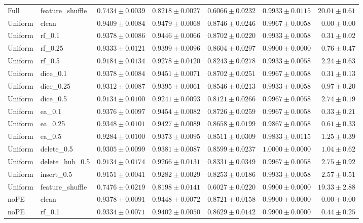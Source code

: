 \documentclass[UTF8,a4paper,11pt,fontset=fandol]{ctexart}
\begin{document}
{\begin{longtable}{llrrrrr}
Full & feature\_shuffle & $0.7434\pm0.0039$ & $0.8218\pm0.0027$ & $0.6066\pm0.0232$ & $0.9933\pm0.0115$ & $20.01\pm0.61$ \\
Uniform & clean & $0.9409\pm0.0084$ & $0.9479\pm0.0068$ & $0.8746\pm0.0246$ & $0.9967\pm0.0058$ & $0.00\pm0.00$ \\
Uniform & rf\_0.1 & $0.9378\pm0.0086$ & $0.9446\pm0.0066$ & $0.8702\pm0.0220$ & $0.9933\pm0.0058$ & $0.31\pm0.02$ \\
Uniform & rf\_0.25 & $0.9333\pm0.0121$ & $0.9399\pm0.0096$ & $0.8604\pm0.0297$ & $0.9900\pm0.0000$ & $0.76\pm0.47$ \\
Uniform & rf\_0.5 & $0.9184\pm0.0134$ & $0.9278\pm0.0120$ & $0.8243\pm0.0278$ & $0.9933\pm0.0058$ & $2.24\pm0.63$ \\
Uniform & dice\_0.1 & $0.9378\pm0.0084$ & $0.9451\pm0.0071$ & $0.8702\pm0.0251$ & $0.9967\pm0.0058$ & $0.31\pm0.13$ \\
Uniform & dice\_0.25 & $0.9312\pm0.0087$ & $0.9395\pm0.0061$ & $0.8546\pm0.0213$ & $0.9933\pm0.0058$ & $0.97\pm0.20$ \\
Uniform & dice\_0.5 & $0.9134\pm0.0100$ & $0.9241\pm0.0093$ & $0.8121\pm0.0266$ & $0.9967\pm0.0058$ & $2.74\pm0.19$ \\
Uniform & ea\_0.1 & $0.9376\pm0.0097$ & $0.9454\pm0.0082$ & $0.8726\pm0.0259$ & $0.9967\pm0.0058$ & $0.33\pm0.21$ \\
Uniform & ea\_0.25 & $0.9348\pm0.0101$ & $0.9427\pm0.0089$ & $0.8658\pm0.0199$ & $0.9867\pm0.0058$ & $0.61\pm0.33$ \\
Uniform & ea\_0.5 & $0.9284\pm0.0100$ & $0.9373\pm0.0095$ & $0.8511\pm0.0309$ & $0.9833\pm0.0115$ & $1.25\pm0.39$ \\
Uniform & delete\_0.5 & $0.9305\pm0.0099$ & $0.9381\pm0.0087$ & $0.8599\pm0.0237$ & $1.0000\pm0.0000$ & $1.04\pm0.62$ \\
Uniform & delete\_hub\_0.5 & $0.9134\pm0.0174$ & $0.9266\pm0.0131$ & $0.8331\pm0.0349$ & $0.9967\pm0.0058$ & $2.75\pm0.92$ \\
Uniform & insert\_0.5 & $0.9151\pm0.0041$ & $0.9282\pm0.0029$ & $0.8253\pm0.0186$ & $0.9933\pm0.0058$ & $2.57\pm0.51$ \\
Uniform & feature\_shuffle & $0.7476\pm0.0219$ & $0.8198\pm0.0141$ & $0.6027\pm0.0220$ & $0.9900\pm0.0000$ & $19.33\pm2.88$ \\
noPE & clean & $0.9378\pm0.0091$ & $0.9448\pm0.0072$ & $0.8721\pm0.0158$ & $0.9900\pm0.0000$ & $0.00\pm0.00$ \\
noPE & rf\_0.1 & $0.9334\pm0.0071$ & $0.9402\pm0.0050$ & $0.8629\pm0.0142$ & $0.9900\pm0.0000$ & $0.44\pm0.25$ \\

\end{longtable}}
\end{document}
